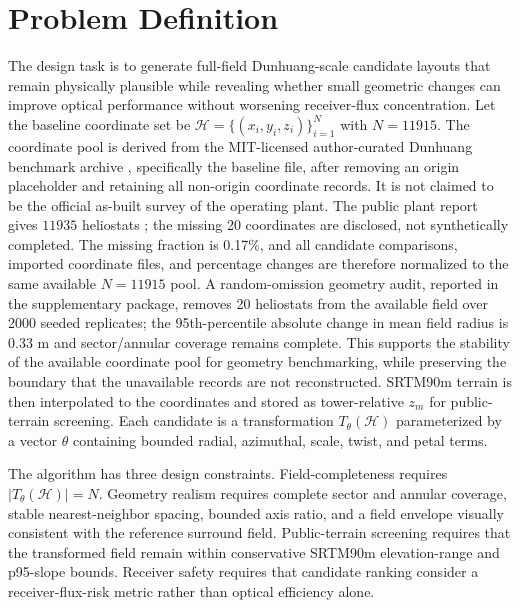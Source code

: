 \documentclass[final,3p,times]{elsarticle}
\begin{document}
\section{Problem Definition}
The design task is to generate full-field Dunhuang-scale candidate layouts that remain physically plausible while revealing whether small geometric changes can improve optical performance without worsening receiver-flux concentration. Let the baseline coordinate set be $\mathcal{H} = \{(x_i,y_i,z_i)\}_{i=1}^N$ with $N=11915$. The coordinate pool is derived from the MIT-licensed author-curated Dunhuang benchmark archive \cite{zaihu2025dunhuangdataset}, specifically the baseline  file, after removing an origin placeholder and retaining all non-origin coordinate records. It is not claimed to be the official as-built survey of the operating plant. The public plant report gives $11935$ heliostats \cite{huang2024dunhuang}; the missing 20 coordinates are disclosed, not synthetically completed. The missing fraction is 0.17\%, and all candidate comparisons, imported coordinate files, and percentage changes are therefore normalized to the same available $N=11915$ pool. A random-omission geometry audit, reported in the supplementary package, removes 20 heliostats from the available field over 2000 seeded replicates; the 95th-percentile absolute change in mean field radius is 0.33 m and sector/annular coverage remains complete. This supports the stability of the available coordinate pool for geometry benchmarking, while preserving the boundary that the unavailable records are not reconstructed. SRTM90m terrain is then interpolated to the coordinates and stored as tower-relative $z_m$ for public-terrain screening. Each candidate is a transformation $T_\theta(\mathcal{H})$ parameterized by a vector $\theta$ containing bounded radial, azimuthal, scale, twist, and petal terms.

The algorithm has three design constraints. Field-completeness requires $|T_\theta(\mathcal{H})|=N$. Geometry realism requires complete sector and annular coverage, stable nearest-neighbor spacing, bounded axis ratio, and a field envelope visually consistent with the reference surround field. Public-terrain screening requires that the transformed field remain within conservative SRTM90m elevation-range and p95-slope bounds. Receiver safety requires that candidate ranking consider a receiver-flux-risk metric rather than optical efficiency alone.
\end{document}

